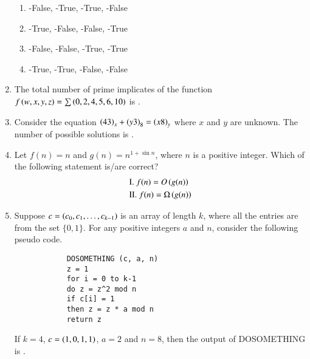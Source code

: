 \documentclass[journal,12pt,onecolumn]{IEEEtran}
\theoremstyle{remark}
\begin{document}
\begin{enumerate}
		\hfill{}
		
		\begin{enumerate}
			\item {}-False, -True, -True, -False
			\item {}-True, -False, -False, -True
			\item {}-False, -False, -True, -True
			\item {}-True, -True, -False, -False
		\end{enumerate}
		
		\item The total number of prime implicates of the function $f\left(w,x,y,z\right) = \sum\left(0,2,4,5,6,10\right)$ is \underline{\hspace{2cm}}.
		
		\hfill{}
		
		\item Consider the equation $\left(43\right)_x + \left(y3\right)_8 = \left(x8\right)_y$ where $x$ and $y$ are unknown. The number of possible solutions is \underline{\hspace{2cm}}.
		
		\hfill{}
		
		\item Let $f(n)=n$ and $g(n)=n^{1+\sin n}$, where $n$ is a positive integer. Which of the following statement is/are correct?
		\begin{align*}
			&\text{I. } f(n) = O\left(g(n)\right)\\
			&\text{II. } f(n) = \Omega\left(g(n)\right)
		\end{align*}
		
		\hfill{}
		
		\begin{enumerate}
		\end{enumerate}
		
		\item Suppose $c = \left(c_0, c_1, \ldots, c_{k-1}\right)$ is an array of length $k$, where all the entries are from the set $\{0, 1\}$. For any positive integers $a$ and $n$, consider the following pseudo code.
		\begin{verbatim}
			DOSOMETHING (c, a, n)
			z = 1
			for i = 0 to k-1
			do z = z^2 mod n
			if c[i] = 1
			then z = z * a mod n
			return z
		\end{verbatim}
		If $k = 4$, $c = \left(1,0,1,1\right)$, $a = 2$ and $n = 8$, then the output of DOSOMETHING  is \underline{\hspace{2cm}}.
		

\end{enumerate}
\end{document}
